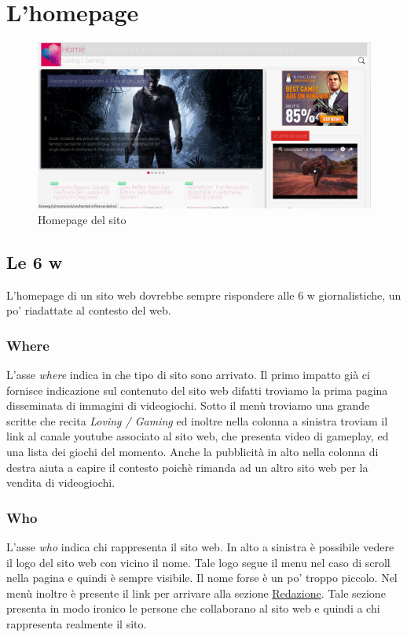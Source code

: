 \documentclass[../ProgettoTecWeb2.tex]{subfiles}
\begin{document}
\section{L'homepage}
	\begin{figure} [h]
		\centering
		\includegraphics[scale=0.3]{img/ScreenHomePage}
		\caption{Homepage del sito}
		\label{fig:AprireProgetto}
	\end{figure}
	\subsection{Le 6 w}
		L'homepage di un sito web dovrebbe sempre rispondere alle 6 w giornalistiche, un po' riadattate al contesto del web.
		\subsubsection{Where}
			L'asse \textit{where} indica in che tipo di sito sono arrivato. Il primo impatto già ci fornisce indicazione sul contenuto del sito web difatti troviamo la prima pagina disseminata di immagini di videogiochi. Sotto il menù troviamo una grande scritte che recita \textit{Loving / Gaming} ed inoltre nella colonna a sinistra troviam il link al canale youtube associato al sito web, che presenta video di gameplay, ed una lista dei giochi del momento. Anche la pubblicità in alto nella colonna di destra aiuta a capire il contesto poichè rimanda ad un altro sito web per la vendita di videogiochi.
		\subsubsection{Who}
			L'asse \textit{who} indica chi rappresenta il sito web. In alto a sinistra è possibile vedere il logo del sito web con vicino il nome. Tale logo segue il menu nel caso di scroll nella pagina e quindi è sempre visibile. Il nome forse è un po' troppo piccolo. Nel menù inoltre è presente il link per arrivare alla sezione \href{http://ilovevg.it/redazione/}{Redazione}. Tale sezione presenta in modo ironico le persone che collaborano al sito web e quindi a chi rappresenta realmente il sito.
\end{document}
